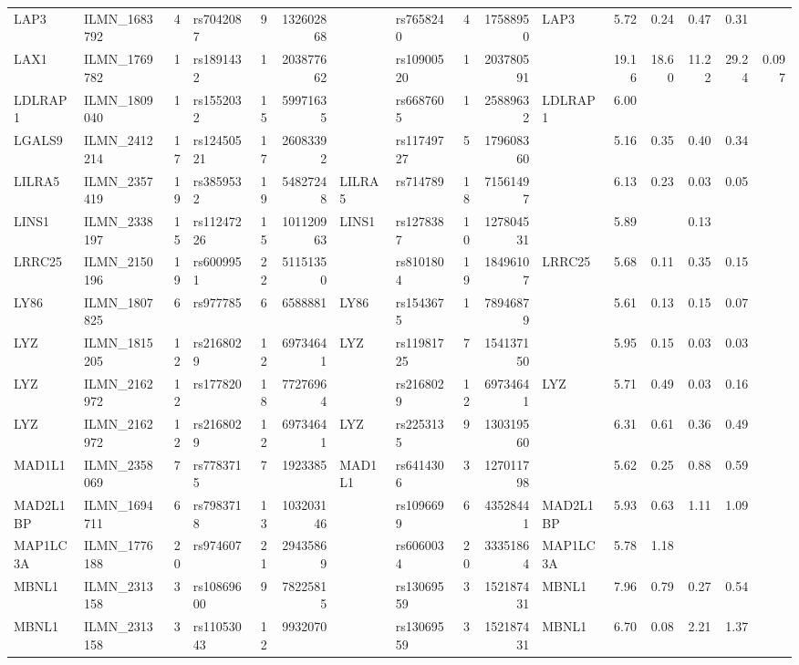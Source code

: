 \documentclass{article}
\begin{document}
\begin{landscape}
{\begin{ThreePartTable}
\begin{longtable}{|llr|lrrl|lrrl|rrrr|r|}
  LAP3 & ILMN\_1683792 & 4 & rs7042087 & 9 & 132602868 &  & rs7658240 & 4 & 17588950 & LAP3 & 5.72 & 0.24 & 0.47 & 0.31 &  \\
  LAX1 & ILMN\_1769782 & 1 & rs1891432 & 1 & 203877662 &  & rs10900520 & 1 & 203780591 &  & 19.16 & 18.60 & 11.22 & 29.24 & 0.097 \\
  LDLRAP1 & ILMN\_1809040 & 1 & rs1552032 & 15 & 59971635 &  & rs6687605 & 1 & 25889632 & LDLRAP1 & 6.00 &  &  &  &  \\
  LGALS9 & ILMN\_2412214 & 17 & rs12450521 & 17 & 26083392 &  & rs11749727 & 5 & 179608360 &  & 5.16 & 0.35 & 0.40 & 0.34 &  \\
  LILRA5 & ILMN\_2357419 & 19 & rs3859532 & 19 & 54827248 & LILRA5 & rs714789 & 18 & 71561497 &  & 6.13 & 0.23 & 0.03 & 0.05 &  \\
  LINS1 & ILMN\_2338197 & 15 & rs11247226 & 15 & 101120963 & LINS1 & rs1278387 & 10 & 127804531 &  & 5.89 &  & 0.13 &  &  \\
  LRRC25 & ILMN\_2150196 & 19 & rs6009951 & 22 & 51151350 &  & rs8101804 & 19 & 18496107 & LRRC25 & 5.68 & 0.11 & 0.35 & 0.15 &  \\
  LY86 & ILMN\_1807825 & 6 & rs977785 & 6 & 6588881 & LY86 & rs1543675 & 1 & 78946879 &  & 5.61 & 0.13 & 0.15 & 0.07 &  \\
  LYZ & ILMN\_1815205 & 12 & rs2168029 & 12 & 69734641 & LYZ & rs11981725 & 7 & 154137150 &  & 5.95 & 0.15 & 0.03 & 0.03 &  \\
  LYZ & ILMN\_2162972 & 12 & rs177820 & 18 & 77276964 &  & rs2168029 & 12 & 69734641 & LYZ & 5.71 & 0.49 & 0.03 & 0.16 &  \\
  LYZ & ILMN\_2162972 & 12 & rs2168029 & 12 & 69734641 & LYZ & rs2253135 & 9 & 130319560 &  & 6.31 & 0.61 & 0.36 & 0.49 &  \\
  MAD1L1 & ILMN\_2358069 & 7 & rs7783715 & 7 & 1923385 & MAD1L1 & rs6414306 & 3 & 127011798 &  & 5.62 & 0.25 & 0.88 & 0.59 &  \\
  MAD2L1BP & ILMN\_1694711 & 6 & rs7983718 & 13 & 103203146 &  & rs1096699 & 6 & 43528441 & MAD2L1BP & 5.93 & 0.63 & 1.11 & 1.09 &  \\
  MAP1LC3A & ILMN\_1776188 & 20 & rs974607 & 21 & 29435869 &  & rs6060034 & 20 & 33351864 & MAP1LC3A & 5.78 & 1.18 &  &  &  \\
  MBNL1 & ILMN\_2313158 & 3 & rs10869600 & 9 & 78225815 &  & rs13069559 & 3 & 152187431 & MBNL1 & 7.96 & 0.79 & 0.27 & 0.54 &  \\
  MBNL1 & ILMN\_2313158 & 3 & rs11053043 & 12 & 9932070 &  & rs13069559 & 3 & 152187431 & MBNL1 & 6.70 & 0.08 & 2.21 & 1.37 &  \\

\end{longtable}
\end{ThreePartTable}}
\end{landscape}
\end{document}
